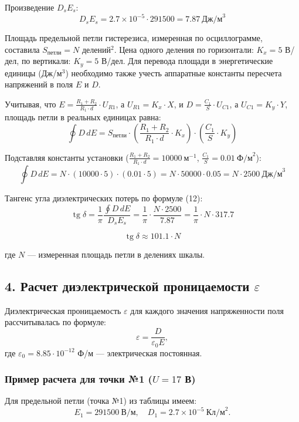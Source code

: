 \documentclass[a4paper,14pt]{article}
\begin{document}
Произведение \(D_s E_s\):
\[
D_s E_s = 2.7 \times 10^{-5} \cdot 291500 = 7.87 \ \text{Дж/м}^3
\]

Площадь предельной петли гистерезиса, измеренная по осциллограмме, составила \(S_{\text{петли}} = N\) делений\(^2\). Цена одного деления по горизонтали: \(K_x = 5\) В/дел, по вертикали: \(K_y = 5\) В/дел. Для перевода площади в энергетические единицы (Дж/м\(^3\)) необходимо также учесть аппаратные константы пересчета напряжений в поля \(E\) и \(D\).

Учитывая, что \(E = \frac{R_1 + R_2}{R_1 \cdot d} \cdot U_{R1}\), а \(U_{R1} = K_x \cdot X\), и \(D = \frac{C_1}{S} \cdot U_{C1}\), а \(U_{C1} = K_y \cdot Y\), площадь петли в реальных единицах равна:
\[
\oint D \, dE = S_{\text{петли}} \cdot \left( \frac{R_1 + R_2}{R_1 \cdot d} \cdot K_x \right) \cdot \left( \frac{C_1}{S} \cdot K_y \right)
\]

Подставляя константы установки (\( \frac{R_1 + R_2}{R_1 \cdot d} = 10000 \ \text{м}^{-1}\), \( \frac{C_1}{S} = 0.01 \ \text{Ф/м}^2 \)):
\[
\oint D \, dE = N \cdot (10000 \cdot 5) \cdot (0.01 \cdot 5) = N \cdot 50000 \cdot 0.05 = N \cdot 2500 \ \text{Дж/м}^3
\]

Тангенс угла диэлектрических потерь по формуле (12):
\[
\operatorname{tg} \delta = \frac{1}{\pi} \frac{\oint D \, dE}{D_s E_s} = \frac{1}{\pi} \cdot \frac{N \cdot 2500}{7.87} = \frac{1}{\pi} \cdot N \cdot 317.7
\]

\[
\boxed{\operatorname{tg} \delta \approx 101.1 \cdot N}
\]

где \(N\) — измеренная площадь петли в делениях шкалы.
\subsection*{4. Расчет диэлектрической проницаемости \(\varepsilon\)}

Диэлектрическая проницаемость \(\varepsilon\) для каждого значения напряженности поля рассчитывалась по формуле:
\[
\varepsilon = \frac{D}{\varepsilon_0 E},
\]
где \(\varepsilon_0 = 8.85 \cdot 10^{-12}\) Ф/м — электрическая постоянная.

\subsubsection*{Пример расчета для точки №1 (\(U = 17\) В)}

Для предельной петли (точка №1) из таблицы имеем:
\[
E_1 = 291500 \ \text{В/м}, \quad D_1 = 2.7 \times 10^{-5} \ \text{Кл/м}^2.
\]
\end{document}
